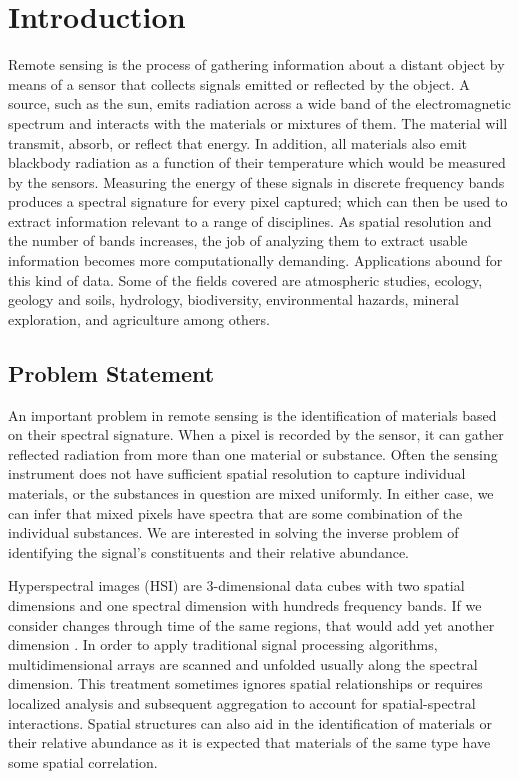 \chapter{Introduction}  %
Remote sensing is the process of gathering information about a distant object by means of a sensor that collects signals emitted or reflected by the object.  A source, such as the sun, emits radiation across a wide band of the electromagnetic spectrum and interacts with the materials or mixtures of them.  The material will transmit, absorb, or reflect that energy.  In addition, all materials also emit blackbody radiation as a function of their temperature which would be measured by the sensors.  Measuring the energy of these signals in discrete frequency bands produces a spectral signature for every pixel captured; which can then be used to extract information relevant to a range of disciplines.  As spatial resolution and the number of bands increases, the job of analyzing them to extract usable information becomes more computationally demanding.  Applications abound for this kind of data.  Some of the fields covered are atmospheric studies, ecology, geology and soils, hydrology, biodiversity, environmental hazards, mineral exploration, and agriculture among others. 
\section{Problem Statement}
An important problem in remote sensing is the identification of materials based on their spectral signature.  When a pixel is recorded by the sensor, it can gather reflected radiation from more than one material or substance.  Often the sensing instrument does not have sufficient spatial resolution to capture individual materials, or the substances in question are mixed uniformly.  In either case, we can infer that mixed pixels have spectra that are some combination of the individual substances.  We are interested in solving the inverse problem of identifying the signal's constituents and their relative abundance.  

Hyperspectral images (HSI) are 3-dimensional data cubes with two spatial dimensions and one spectral dimension with hundreds frequency bands.  If we consider changes through time of the same regions, that would add yet another dimension \cite{goenaga_unmixing_2013} \cite{reyes_change_2017}.  In order to apply traditional signal processing algorithms, multidimensional arrays are scanned and unfolded usually along the spectral dimension.  This treatment sometimes ignores spatial relationships or requires localized analysis and subsequent aggregation to account for spatial-spectral interactions.  Spatial structures can also aid in the identification of materials or their relative abundance as it is expected that materials of the same type have some spatial correlation.

